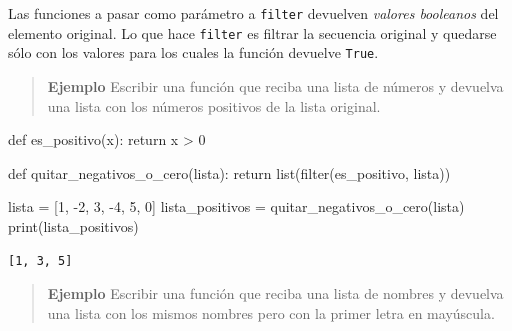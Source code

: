 \documentclass[
  letterpaper,
  DIV=11,
  numbers=noendperiod]{scrreprt}
\newenvironment{Shaded}{\begin{snugshade}}{\end{snugshade}}
\newcommand{\BuiltInTok}[1]{\textcolor[rgb]{0.00,0.23,0.31}{#1}}
\newcommand{\ControlFlowTok}[1]{\textcolor[rgb]{0.00,0.23,0.31}{#1}}
\newcommand{\DecValTok}[1]{\textcolor[rgb]{0.68,0.00,0.00}{#1}}
\newcommand{\KeywordTok}[1]{\textcolor[rgb]{0.00,0.23,0.31}{#1}}
\newcommand{\NormalTok}[1]{\textcolor[rgb]{0.00,0.23,0.31}{#1}}
\newcommand{\OperatorTok}[1]{\textcolor[rgb]{0.37,0.37,0.37}{#1}}
\begin{document}
\begin{tcolorbox}[enhanced jigsaw, colframe=quarto-callout-tip-color-frame, opacityback=0, opacitybacktitle=0.6, bottomrule=.15mm, toprule=.15mm, coltitle=black, breakable, colback=white, leftrule=.75mm, titlerule=0mm, bottomtitle=1mm, toptitle=1mm, rightrule=.15mm, title=\textcolor{quarto-callout-tip-color}{\faLightbulb}\hspace{0.5em}{Tip}, arc=.35mm, left=2mm, colbacktitle=quarto-callout-tip-color!10!white]

Las funciones a pasar como parámetro a \texttt{filter} devuelven
\emph{valores booleanos} del elemento original. Lo que hace
\texttt{filter} es filtrar la secuencia original y quedarse sólo con los
valores para los cuales la función devuelve \texttt{True}.

\end{tcolorbox}

\begin{quote}
\textbf{Ejemplo} Escribir una función que reciba una lista de números y
devuelva una lista con los números positivos de la lista original.
\end{quote}

\begin{Shaded}
\begin{Highlighting}[]
\KeywordTok{def}\NormalTok{ es\_positivo(x):}
  \ControlFlowTok{return}\NormalTok{ x }\OperatorTok{\textgreater{}} \DecValTok{0}

\KeywordTok{def}\NormalTok{ quitar\_negativos\_o\_cero(lista):}
  \ControlFlowTok{return} \BuiltInTok{list}\NormalTok{(}\BuiltInTok{filter}\NormalTok{(es\_positivo, lista))}

\NormalTok{lista }\OperatorTok{=}\NormalTok{ [}\DecValTok{1}\NormalTok{, }\OperatorTok{{-}}\DecValTok{2}\NormalTok{, }\DecValTok{3}\NormalTok{, }\OperatorTok{{-}}\DecValTok{4}\NormalTok{, }\DecValTok{5}\NormalTok{, }\DecValTok{0}\NormalTok{]}
\NormalTok{lista\_positivos }\OperatorTok{=}\NormalTok{ quitar\_negativos\_o\_cero(lista)}
\BuiltInTok{print}\NormalTok{(lista\_positivos)}
\end{Highlighting}
\end{Shaded}

\begin{verbatim}
[1, 3, 5]
\end{verbatim}

\begin{quote}
\textbf{Ejemplo} Escribir una función que reciba una lista de nombres y
devuelva una lista con los mismos nombres pero con la primer letra en
mayúscula.
\end{quote}
\end{document}
